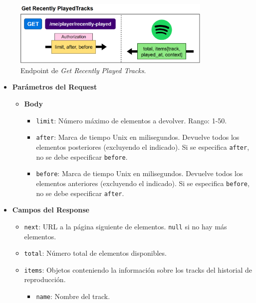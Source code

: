 \begin{figure}[H]
    \centering
    \includegraphics[width=0.85\textwidth]{figures/endpoints/get_recently_played_tracks.png}
    \caption{Endpoint de \textit{Get Recently Played Tracks}.}
    \label{fig:get_recently_played_tracks}
\end{figure}

\begin{itemize}
    \item \textbf{Parámetros del Request}
          \begin{itemize}
              \item \textbf{Body}
                    \begin{itemize}
                        \item \texttt{limit}: Número máximo de elementos a devolver. Rango: 1-50.
                        \item \texttt{after}: Marca de tiempo Unix en milisegundos. Devuelve todos los elementos posteriores (excluyendo el indicado). Si se especifica \texttt{after}, no se debe especificar \texttt{before}.
                        \item \texttt{before}: Marca de tiempo Unix en milisegundos. Devuelve todos los elementos anteriores (excluyendo el indicado). Si se especifica \texttt{before}, no se debe especificar \texttt{after}.
                    \end{itemize}
          \end{itemize}
    \item \textbf{Campos del Response}
          \begin{itemize}
              \item \texttt{next}: URL a la página siguiente de elementos. \texttt{null} si no hay más elementos.
              \item \texttt{total}: Número total de elementos disponibles.
              \item \texttt{items}: Objetos conteniendo la información sobre los tracks del historial de reproducción.
                    \begin{itemize}
                        \item \texttt{name}: Nombre del track.

\end{itemize}
\end{itemize}
\end{itemize}
